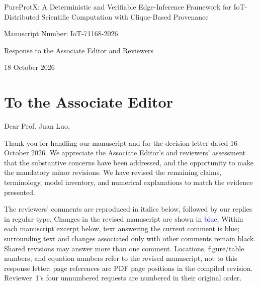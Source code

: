 \documentclass[11pt]{article}
\begin{document}
\hypersetup{pageanchor=false}
\begin{titlepage}
\centering
\vspace*{\fill}
{\Large PureProtX: A Deterministic and Verifiable Edge-Inference Framework
for IoT-Distributed Scientific Computation with Clique-Based Provenance\par}
\vspace{0.6cm}
{\large Manuscript Number: IoT-71168-2026\par}
\vspace{0.6cm}
{\large Response to the Associate Editor and Reviewers\par}
\vspace{0.6cm}
{18 October 2026\par}
\vspace*{\fill}
\end{titlepage}
\hypersetup{pageanchor=true}

\section*{To the Associate Editor}
Dear Prof. Juan Luo,

Thank you for handling our manuscript and for the decision letter dated
16 October 2026. We appreciate the Associate Editor's and reviewers'
assessment that the substantive concerns have been addressed, and the
opportunity to make the mandatory minor revisions. We have revised the
remaining claims, terminology, model inventory, and numerical explanations
to match the evidence presented.

The reviewers' comments are reproduced in italics below, followed by our
replies in regular type. Changes in the revised manuscript are shown in
\textcolor{blue}{blue}. Within each manuscript excerpt
below, text answering the current comment is blue; surrounding text and
changes associated only with other comments remain black. Shared revisions
may answer more than one comment. Locations, figure/table numbers, and
equation numbers refer to the revised manuscript, not to this response
letter; page references are PDF page positions in the compiled revision.
Reviewer~1's four unnumbered requests are numbered in their original order.
\end{document}
